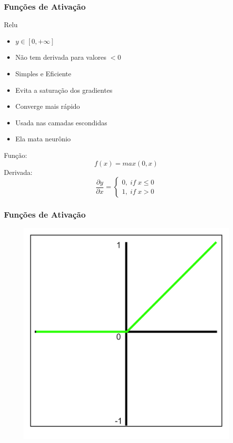 \documentclass{beamer}
\begin{document}
\begin{frame}
	\frametitle{Funções de Ativação}
	\begin{block}{Relu}
		\begin{itemize}
			\item $y \in [0, + \infty]$
			\item Não tem derivada para valores $<0$
			\item Simples e Eficiente
			\item Evita a saturação dos gradientes
			\item Converge mais rápido
			\item Usada nas camadas escondidas
			\item Ela mata neurônio
		\end{itemize}
		Função:
		$$f(x) = max(0, x)$$
		Derivada: 	$$\frac{\partial y}{\partial x} =
		\left\{\begin{matrix}
			0,\; if \; x \leq 0
			\\ 
			1, \; if \; x > 0
		\end{matrix}\right.$$
	\end{block}
\end{frame}
\begin{frame}
	\frametitle{Funções de Ativação}
	\begin{figure}
		\centering
		\includegraphics[width=0.4\linewidth]{figures/relu_function}
	\end{figure}
\end{frame}
\end{document}
